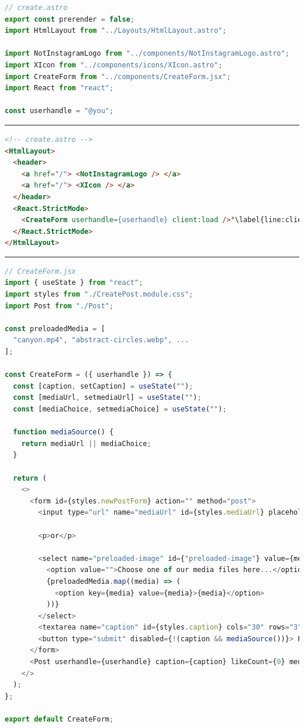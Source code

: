 \documentclass[a4paper, 12pt]{article}
\begin{document}
\vspace{1cm}
\begin{lstlisting}[caption=Create page in Astro (Frontmatter), label={lst:Astro:Create:Script}, language=JavaScript]
// create.astro 
export const prerender = false;
import HtmlLayout from "../Layouts/HtmlLayout.astro";
  
import NotInstagramLogo from "../components/NotInstagramLogo.astro";
import XIcon from "../components/icons/XIcon.astro";
import CreateForm from "../components/CreateForm.jsx";
import React from "react";

const userhandle = "@you";
\end{lstlisting}
\hrule
\begin{lstlisting}[caption=Create page in Astro (HTML), label={lst:Astro:Create:HTML}, language=HTML, firstnumber=11, escapechar=°]
<!-- create.astro -->
<HtmlLayout>
  <header>
    <a href="/"> <NotInstagramLogo /> </a>
    <a href="/"> <XIcon /> </a>
  </header>
  <React.StrictMode>
    <CreateForm userhandle={userhandle} client:load />°\label{line:clientLoad}°
  </React.StrictMode>
</HtmlLayout>
\end{lstlisting}
\hrule
\begin{lstlisting}[caption=Create form in Astro, label={lst:Astro:Createform}, language=JavaScript]
// CreateForm.jsx
import { useState } from "react";
import styles from "./CreatePost.module.css";
import Post from "./Post";

const preloadedMedia = [
  "canyon.mp4", "abstract-circles.webp", ...
];

const CreateForm = ({ userhandle }) => {
  const [caption, setCaption] = useState("");
  const [mediaUrl, setmediaUrl] = useState("");
  const [mediaChoice, setmediaChoice] = useState("");

  function mediaSource() {
    return mediaUrl || mediaChoice;
  }

  return (
    <>
      <form id={styles.newPostForm} action="" method="post">
        <input type="url" name="mediaUrl" id={styles.mediaUrl} placeholder="Insert your media URL here..." value={mediaUrl} onChange={(event) => setmediaUrl(event.target.value)} />

        <p>or</p>

        <select name="preloaded-image" id={"preloaded-image"} value={mediaChoice} onChange={(event) => setmediaChoice(event.target.value)}>
          <option value="">Choose one of our media files here...</option>
          {preloadedMedia.map((media) => (
            <option key={media} value={media}>{media}</option>
          ))}
        </select>
        <textarea name="caption" id={styles.caption} cols="30" rows="3" placeholder="Type your caption here" value={caption} onChange={(event) => setCaption(event.target.value)}/>
        <button type="submit" disabled={!(caption && mediaSource())}> Post it! </button>
      </form>
      <Post userhandle={userhandle} caption={caption} likeCount={0} mediaSource={mediaSource()} hideActionIcons={true} />
    </>
  );
};

export default CreateForm;
\end{lstlisting}
\vspace{1cm}
\end{document}

